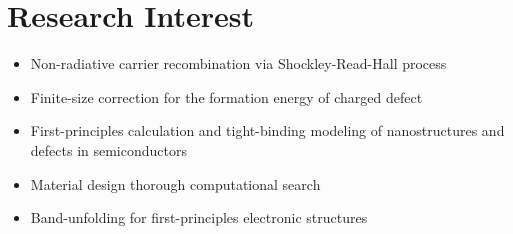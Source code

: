\hypertarget{research-interest}{%
\section{Research Interest}\label{research-interest}}

\begin{itemize}
\tightlist
\item
  Non-radiative carrier recombination via Shockley-Read-Hall process
\item
  Finite-size correction for the formation energy of charged defect
\item
  First-principles calculation and tight-binding modeling of
  nanostructures and defects in semiconductors
\item
  Material design thorough computational search
\item
  Band-unfolding for first-principles electronic structures
\end{itemize}
